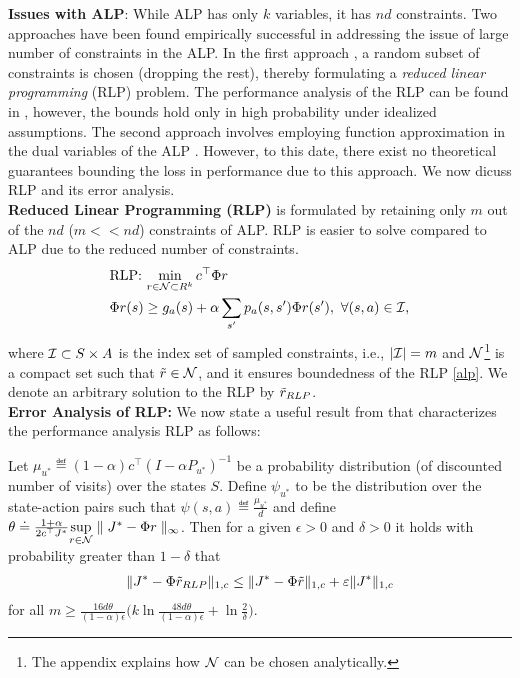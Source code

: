 \textbf{Issues with ALP}: While ALP has only $k$ variables, it has $nd$ constraints.
Two approaches have been found empirically successful \cite{CS,dolgov,ALP-Bor} in addressing the issue of large number of constraints in the ALP. In the first approach \cite{CS}, a random subset of constraints is chosen (dropping the rest), thereby formulating a \emph{reduced linear programming} (RLP) problem. The performance analysis of the RLP can be found in \cite{CS}, however, the bounds hold only in high probability under idealized assumptions. The second approach involves employing function approximation in the dual variables of the ALP \cite{ALP-Bor,dolgov}. However, to this date, there exist no theoretical guarantees bounding the loss in performance due to this approach. We now dicuss RLP and its error analysis.\\
\textbf{Reduced Linear Programming (RLP)} is formulated by retaining only $m$ out of the $nd$ ($m<<nd$) constraints of ALP. RLP is easier to solve compared to ALP due to the reduced number of constraints.
\begin{align}\label{rlp}
\begin{split}
&\text{RLP:~}\underset{r\in \N\subset R^k}{\min}\, c^\top \Phi r\,\,\\
&\Phi r (s)\geq g_a(s)+\alpha\sum_{s'}p_a(s,s')\Phi r(s'),\,\,
\forall (s,a)\in \I,
\end{split}
\end{align}
where $\mathcal{I}\subset S \times A$ is the index set of sampled constraints, i.e., $|\mathcal{I}|=m$ and $\mathcal{N}$\footnote{The appendix explains how $\mathcal{N}$ can be chosen analytically.} is a compact set such that $\tilde{r} \in \mathcal{N}$, and it ensures boundedness of the RLP \eqref{alp}. We denote an arbitrary solution to the RLP by $\tilde{r}_{RLP}$.\\
\textbf{Error Analysis of RLP:} We now state a useful result from \cite{CS} that characterizes the performance analysis RLP as follows:
\begin{theorem}\label{rlpt}
Let $\mu_{u^*}\eqdef(1-\alpha)c^\top (I-\alpha P_{u^*})^{-1}$ be a probability distribution (of discounted number of visits) over the states $S$. Define $\psi_{u^*}$ to be the distribution over the state-action pairs such that $\psi(s,a)\eqdef \frac{\mu_{u^*}}{d}$ and define $\theta\doteq\frac{1+\alpha}{2 c^\top J^*}\underset{r\in \mathcal{N}}{\sup}\parallel J^*-\Phi r \parallel_\infty$. Then for a given $\epsilon>0$ and $\delta>0$ it holds with probability greater than $1-\delta$ that
\begin{align*}
\|J^*-\Phi\tilde{r}_{RLP}\|_{1,c}\leq \|J^*-\Phi\tilde{r}\|_{1,c}+\varepsilon \|J^*\|_{1,c}
\end{align*}
for all $m\geq \frac{16d\theta}{(1-\alpha)\epsilon}\big(k\ln\frac{48d\theta}{(1-\alpha)\epsilon}+\ln \frac{2}{\delta}\big)$.
\end{theorem}
